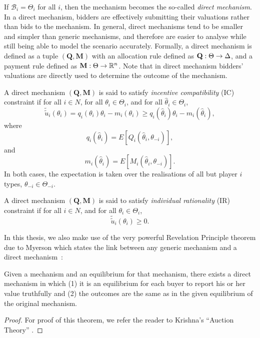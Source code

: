 If $\mathcal{B}_i = \Theta_i$ for all $i$, then the mechanism becomes the so-called \emph{direct mechanism}. In a direct mechanism, bidders are effectively submitting their valuations rather than bids to the mechanism. In general, direct mechanisms tend to be smaller and simpler than generic mechanisms, and therefore are easier to analyse while still being able to model the scenario accurately. Formally, a direct mechanism is defined as a tuple $(\mathbf{Q},\mathbf{M})$ with an allocation rule defined as $\mathbf{Q}:\nobreak\Theta\to\Delta$, and a payment rule defined as $\mathbf{M}:\nobreak\Theta\to\mathbb{R}^n$. Note that in direct mechanism bidders' valuations are directly used to determine the outcome of the mechanism.

A direct mechanism $(\mathbf{Q},\mathbf{M})$ is said to satisfy \emph{incentive compatibility} (IC) constraint if for all $i\in N$, for all $\theta_i\in\Theta_i$, and for all $\hat{\theta}_i\in\Theta_i$,
\begin{equation}
  \tilde{\tilde{u}}_i(\theta_i) = q_i(\theta_i)\theta_i - m_i(\theta_i)\ge q_i(\hat{\theta}_i)\theta_i - m_i(\hat{\theta}_i),
\end{equation}
where
\begin{equation}
  q_i(\hat{\theta}_i) = E[Q_i(\hat{\theta}_i,\theta_{-i})],
\end{equation}
and
\begin{equation}
  m_i(\hat{\theta}_i) = E[M_i(\hat{\theta}_i, \theta_{-i})].
\end{equation}
In both cases, the expectation is taken over the realisations of all but player $i$ types, $\theta_{-i}\in\Theta_{-i}$.

A direct mechanism $(\mathbf{Q}, \mathbf{M})$ is said to satisfy \emph{individual rationality} (IR) constraint if for all $i\in N$, and for all $\theta_i\in\Theta_i$,
\begin{equation}
  \tilde{\tilde{u}}_i(\theta_i)\ge 0.
\end{equation}

In this thesis, we also make use of the very powerful Revelation Principle theorem due to Myerson which states the link between any generic mechanism and a direct mechanism~\cite{Myerson1979, Krishna10}:
\begin{thm}
\label{thm:revelation_principle_notation}
Given a mechanism and an equilibrium for that mechanism, there exists a direct mechanism in which (1) it is an equilibrium for each buyer to report his or her value truthfully and (2) the outcomes are the same as in the given equilibrium of the original mechanism.
\end{thm}
\begin{proof}
For proof of this theorem, we refer the reader to Krishna's ``Auction Theory'' \cite{Krishna10}.
\end{proof}

